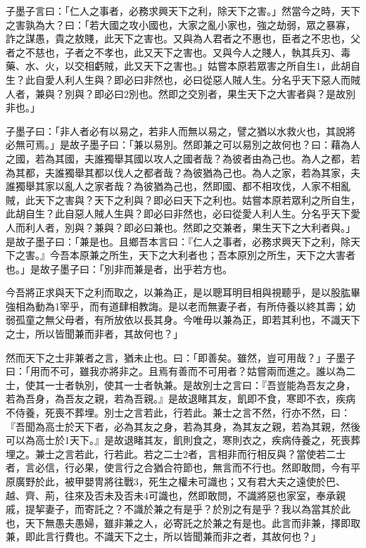 
\begin{pinyinscope}
子墨子言曰：「仁人之事者，必務求興天下之利，除天下之害。」然當今之時，天下之害孰為大？曰：「若大國之攻小國也，大家之亂小家也，強之劫弱，眾之暴寡，詐之謀愚，貴之敖賤，此天下之害也。又與為人君者之不惠也，臣者之不忠也，父者之不慈也，子者之不孝也，此又天下之害也。又與今人之賤人，執其兵刃、毒藥、水、火，以交相虧賊，此又天下之害也。」姑嘗本原若眾害之所自生1，此胡自生？此自愛人利人生與？即必曰非然也，必曰從惡人賊人生。分名乎天下惡人而賊人者，兼與？別與？即必曰2別也。然即之交別者，果生天下之大害者與？是故別非也。」

子墨子曰：「非人者必有以易之，若非人而無以易之，譬之猶以水救火也，其說將必無可焉。」是故子墨子曰：「兼以易別。然即兼之可以易別之故何也？曰：藉為人之國，若為其國，夫誰獨舉其國以攻人之國者哉？為彼者由為己也。為人之都，若為其都，夫誰獨舉其都以伐人之都者哉？為彼猶為己也。為人之家，若為其家，夫誰獨舉其家以亂人之家者哉？為彼猶為己也，然即國、都不相攻伐，人家不相亂賊，此天下之害與？天下之利與？即必曰天下之利也。姑嘗本原若眾利之所自生，此胡自生？此自惡人賊人生與？即必曰非然也，必曰從愛人利人生。分名乎天下愛人而利人者，別與？兼與？即必曰兼也。然即之交兼者，果生天下之大利者與。」是故子墨子曰：「兼是也。且鄉吾本言曰：『仁人之事者，必務求興天下之利，除天下之害。』今吾本原兼之所生，天下之大利者也；吾本原別之所生，天下之大害者也。」是故子墨子曰：「別非而兼是者，出乎若方也。

今吾將正求與天下之利而取之，以兼為正，是以聰耳明目相與視聽乎，是以股肱畢強相為動為1宰乎，而有道肆相教誨。是以老而無妻子者，有所侍養以終其壽；幼弱孤童之無父母者，有所放依以長其身。今唯毋以兼為正，即若其利也，不識天下之士，所以皆聞兼而非者，其故何也？」

然而天下之士非兼者之言，猶未止也。曰：「即善矣。雖然，豈可用哉？」子墨子曰：「用而不可，雖我亦將非之。且焉有善而不可用者？姑嘗兩而進之。誰以為二士，使其一士者執別，使其一士者執兼。是故別士之言曰：『吾豈能為吾友之身，若為吾身，為吾友之親，若為吾親。』是故退睹其友，飢即不食，寒即不衣，疾病不侍養，死喪不葬埋。別士之言若此，行若此。兼士之言不然，行亦不然，曰：『吾聞為高士於天下者，必為其友之身，若為其身，為其友之親，若為其親，然後可以為高士於1天下。』是故退睹其友，飢則食之，寒則衣之，疾病侍養之，死喪葬埋之。兼士之言若此，行若此。若之二士2者，言相非而行相反與？當使若二士者，言必信，行必果，使言行之合猶合符節也，無言而不行也。然即敢問，今有平原廣野於此，被甲嬰冑將往戰3，死生之權未可識也；又有君大夫之遠使於巴、越、齊、荊，往來及否未及否未4可識也，然即敢問，不識將惡也家室，奉承親戚，提挈妻子，而寄託之？不識於兼之有是乎？於別之有是乎？我以為當其於此也，天下無愚夫愚婦，雖非兼之人，必寄託之於兼之有是也。此言而非兼，擇即取兼，即此言行費也。不識天下之士，所以皆聞兼而非之者，其故何也？」


\end{pinyinscope}
